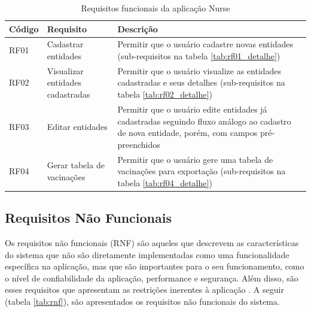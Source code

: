 \begin{table}[ht!]
  \centering
  {
  \begin{tabularx}{\textwidth}{
    | >{\centering\arraybackslash}m{} 
    | >{\centering\arraybackslash}X 
    | >{\raggedright\arraybackslash}X | }
    \hline
    \rowcolor{green!100}
    \textbf{Código} & \textbf{Requisito} & \textbf{Descrição} \\ \hline \hline
    RF01  &  Cadastrar entidades              & Permitir que o usuário cadastre novas entidades (sub-requisitos na tabela \ref{tab:rf01_detalhe}) \\ \hline
    RF02  &  Visualizar entidades cadastradas & Permitir que o usuário visualize as entidades cadastradas e seus detalhes (sub-requisitos na tabela \ref{tab:rf02_detalhe}) \\ \hline
    RF03  &  Editar entidades                 & Permitir que o usuário edite entidades já cadastradas seguindo fluxo análogo ao cadastro de nova entidade, porém, com campos pré-preenchidos \\ \hline
    RF04  &  Gerar tabela de vacinações       & Permitir que o usuário gere uma tabela de vacinações para exportação (sub-requisitos na tabela \ref{tab:rf04_detalhe}) \\ \hline
  \end{tabularx}}
\caption{Requisitos funcionais da aplicação Nurse}
\label{tab:rf}
\end{table}

\subsection{Requisitos Não Funcionais}
\label{cap4:Subsec:RequisitosNaoFuncionais}

Os requisitos não funcionais (RNF) são aqueles que descrevem as características do sistema que não são diretamente implementadas como uma funcionalidade específica na aplicação, mas que são importantes para o seu funcionamento, como o nível de confiabilidade da aplicação, performance e segurança. Além disso, são esses requisitos que apresentam as restrições inerentes à aplicação \cite{sommerville2007engineering}. A seguir (tabela \ref{tab:rnf}), são apresentados os requisitos não funcionais do sistema.

